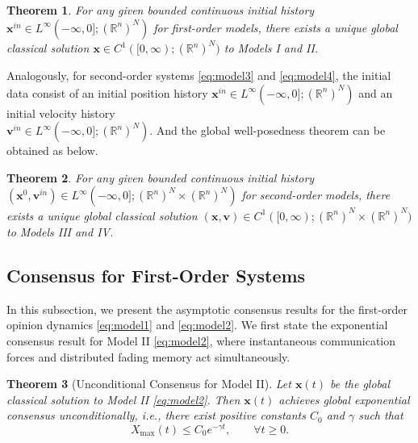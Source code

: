 \documentclass[11pt]{amsart}
\newtheorem{theorem}{Theorem}[section]
\numberwithin{equation}{section}
\begin{document}
\begin{theorem}\label{thm:wellposed}
For any given bounded continuous initial history $\boldsymbol{x}^{in} \in L^\infty(-\infty, 0]; (\mathbb{R}^n)^N)$ for first-order models, there exists a unique global classical solution $\boldsymbol{x} \in C^1([0,\infty); (\mathbb{R}^n)^N)$ to Models I and II.
\end{theorem}

Analogously, for second-order systems \eqref{eq:model3} and \eqref{eq:model4}, the initial data consist of an initial position history $\boldsymbol{x}^{in} \in L^\infty(-\infty, 0]; (\mathbb{R}^n)^N)$ and an initial velocity history \\$\boldsymbol{v}^{in} \in L^\infty(-\infty, 0]; (\mathbb{R}^n)^N)$. And the global well-posedness theorem can be obtained as below.

\begin{theorem}\label{thm:wellposed-1}
For any given bounded continuous initial history \\$(\boldsymbol{x}^{0}, \boldsymbol{v}^{in}) \in L^\infty(-\infty, 0]; (\mathbb{R}^n)^N \times (\mathbb{R}^n)^N)$ for second-order models, there exists a unique global classical solution $(\boldsymbol{x},\boldsymbol{v}) \in C^1([0,\infty); (\mathbb{R}^n)^N \times (\mathbb{R}^n)^N)$ to Models III and IV.
\end{theorem}

\subsection{Consensus for First-Order Systems}
In this subsection, we present the asymptotic consensus results for the first-order opinion dynamics \eqref{eq:model1} and \eqref{eq:model2}. We first state the exponential consensus result for Model II \eqref{eq:model2}, where instantaneous communication forces and distributed fading memory act simultaneously.

\begin{theorem}[Unconditional Consensus for Model II]\label{thm:model2}
Let $\boldsymbol{x}(t)$ be the global classical solution to Model II \eqref{eq:model2}. Then $\boldsymbol{x}(t)$ achieves global exponential consensus unconditionally, i.e., there exist positive constants $C_0$ and $\gamma$ such that
\begin{equation*}
X_{\max}(t) \le C_0 e^{-\gamma t}, \qquad \forall t \ge 0.
\end{equation*}
\end{theorem}
\end{document}
